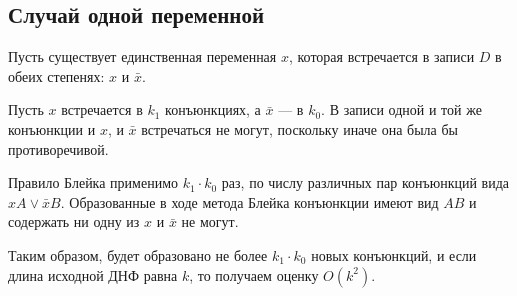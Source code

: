 \documentclass[12pt,a4paper,oneside,fleqn,leqno]{article}
\theoremstyle{definition}
\begin{document}
		\subsection{Случай одной переменной}
			Пусть существует единственная переменная $x$, которая встречается в записи $D$ в обеих степенях: $x$ и $\bar{x}$.\par
			Пусть $x$ встречается в $k_1$ конъюнкциях, а $\bar{x}$ --- в $k_0.$ В записи одной и той же конъюнкции и $x$, и $\bar{x}$ встречаться не могут, поскольку иначе она была бы противоречивой.\par
			Правило Блейка применимо $k_1\cdot k_0$ раз, по числу различных пар конъюнкций вида $xA \vee \bar{x}B.$ Образованные в ходе метода Блейка конъюнкции имеют вид $AB$ и содержать ни одну из $x$ и $\bar{x}$ не могут.\par
			Таким образом, будет образовано не более $k_1\cdot k_0$ новых конъюнкций, и если длина исходной ДНФ равна $k$, то получаем оценку $O(k^2).$

\end{document}
